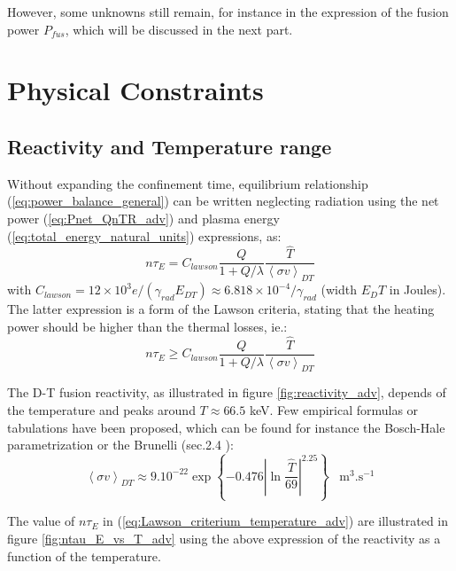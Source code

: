 However, some unknowns still remain, for instance in the expression of the fusion power $P_{fus}$, which will be discussed in the next part.

\section{Physical Constraints}
\subsection{Reactivity and Temperature range}
Without expanding the confinement time, equilibrium relationship (\ref{eq:power_balance_general}) can be written neglecting radiation using the net power (\ref{eq:Pnet_QnTR_adv}) and plasma energy (\ref{eq:total_energy_natural_units}) expressions, as:
$$
n \tau_E 
=
C_{lawson}
\frac{Q}{1+Q/\lambda}
\frac{\hat T }{\left< \sigma v \right>_{DT} }
$$ 
with $C_{lawson} = 12\times10^3 e / (\gamma_{rad} E_{DT})\approx 6.818\times10^{-4}/\gamma_{rad}$ (width $E_DT$ in Joules). The latter expression is a form of the Lawson criteria, stating that the heating power should be higher than the thermal losses, ie.:
\begin{equation}
	n \tau_E 
	\geqslant
	C_{lawson}
	\frac{Q}{1+Q/\lambda}
	\frac{\hat T }{\left< \sigma v \right>_{DT} }
\label{eq:Lawson_criterium_temperature_adv}
\end{equation} 


The D-T fusion reactivity, as illustrated in figure \ref{fig:reactivity_adv}, depends of the temperature and peaks around $T \approx 66.5$ keV. Few empirical formulas or tabulations have been proposed, which can be found for instance the Bosch-Hale parametrization \cite[sec.9.8]{Hartwig2016} or the Brunelli (sec.2.4 ):
\begin{equation}
\left< \sigma v \right>_{DT} \approx 9.10^{-22}
\exp\left\{ -0.476 \left| \ln\frac{\hat T}{69} \right|^{2.25}\right\}
\;\;\;\textrm{m}^3.\textrm{s}^{-1}
\end{equation}
 
The value of $n \tau_E$ in (\ref{eq:Lawson_criterium_temperature_adv}) are illustrated in figure \ref{fig:ntau_E_vs_T_adv} using the above expression of the reactivity as a function of the temperature.

